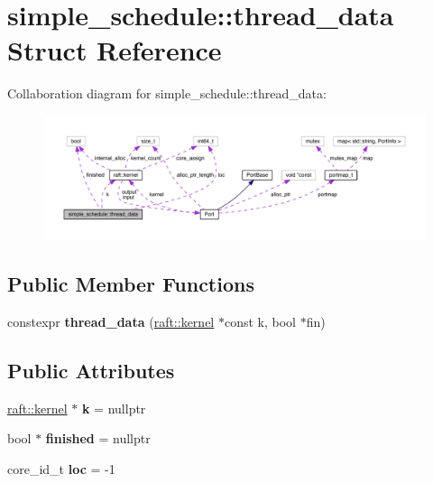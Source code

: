 \hypertarget{structsimple__schedule_1_1thread__data}{}\section{simple\+\_\+schedule\+:\+:thread\+\_\+data Struct Reference}
\label{structsimple__schedule_1_1thread__data}


Collaboration diagram for simple\+\_\+schedule\+:\+:thread\+\_\+data\+:
\nopagebreak
\begin{figure}[H]
\begin{center}
\leavevmode
\includegraphics[width=350pt]{structsimple__schedule_1_1thread__data__coll__graph}
\end{center}
\end{figure}
\subsection*{Public Member Functions}
\begin{DoxyCompactItemize}
\item 
\hypertarget{structsimple__schedule_1_1thread__data_a8924706eac4a3edfec199109be4b046d}{}\label{structsimple__schedule_1_1thread__data_a8924706eac4a3edfec199109be4b046d} 
constexpr {\bfseries thread\+\_\+data} (\hyperlink{classraft_1_1kernel}{raft\+::kernel} $\ast$const k, bool $\ast$fin)
\end{DoxyCompactItemize}
\subsection*{Public Attributes}
\begin{DoxyCompactItemize}
\item 
\hypertarget{structsimple__schedule_1_1thread__data_a305aa7c84f8d5ca9e5be14587aab1d4b}{}\label{structsimple__schedule_1_1thread__data_a305aa7c84f8d5ca9e5be14587aab1d4b} 
\hyperlink{classraft_1_1kernel}{raft\+::kernel} $\ast$ {\bfseries k} = nullptr
\item 
\hypertarget{structsimple__schedule_1_1thread__data_a709b2a546fdec27844576378018b553e}{}\label{structsimple__schedule_1_1thread__data_a709b2a546fdec27844576378018b553e} 
bool $\ast$ {\bfseries finished} = nullptr
\item 
\hypertarget{structsimple__schedule_1_1thread__data_a248e099288fea414f6b666a07a8428b2}{}\label{structsimple__schedule_1_1thread__data_a248e099288fea414f6b666a07a8428b2} 
core\+\_\+id\+\_\+t {\bfseries loc} = -\/1
\end{DoxyCompactItemize}


